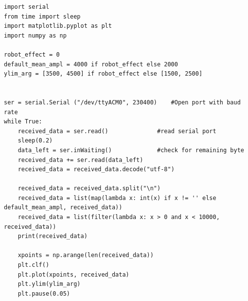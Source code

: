\documentclass[11pt]{article}
\begin{document}
\begin{verbatim}
import serial
from time import sleep
import matplotlib.pyplot as plt
import numpy as np

robot_effect = 0
default_mean_ampl = 4000 if robot_effect else 2000
ylim_arg = [3500, 4500] if robot_effect else [1500, 2500]


ser = serial.Serial ("/dev/ttyACM0", 230400)    #Open port with baud rate
while True:
    received_data = ser.read()              #read serial port
    sleep(0.2)
    data_left = ser.inWaiting()             #check for remaining byte
    received_data += ser.read(data_left)
    received_data = received_data.decode("utf-8")

    received_data = received_data.split("\n")
    received_data = list(map(lambda x: int(x) if x != '' else default_mean_ampl, received_data))
    received_data = list(filter(lambda x: x > 0 and x < 10000, received_data))
    print(received_data)

    xpoints = np.arange(len(received_data))
    plt.clf()
    plt.plot(xpoints, received_data)
    plt.ylim(ylim_arg)
    plt.pause(0.05)
\end{verbatim}
\end{document}

